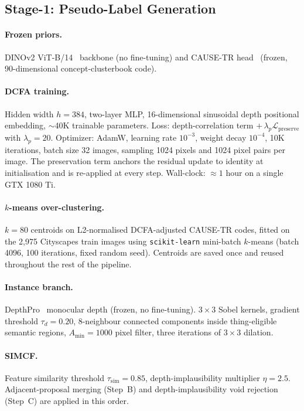 \documentclass{article}
\begin{document}
\subsection{Stage-1: Pseudo-Label Generation}
\label{sec:supp:impl:stage1}

\paragraph{Frozen priors.}
DINOv2 ViT-B/14~\cite{oquab2024dinov2} backbone (no fine-tuning) and CAUSE-TR head~\cite{kim2024cause} (frozen, 90-dimensional concept-clusterbook code).

\paragraph{DCFA training.}
Hidden width $h{=}384$, two-layer MLP, 16-dimensional sinusoidal depth positional embedding, $\sim$40K trainable parameters. Loss: depth-correlation term $+\,\lambda_p \mathcal{L}_\text{preserve}$ with $\lambda_p{=}20$. Optimizer: AdamW, learning rate $10^{-3}$, weight decay $10^{-4}$, 10K iterations, batch size 32 images, sampling 1024 pixels and 1024 pixel pairs per image. The preservation term anchors the residual update to identity at initialisation and is re-applied at every step. Wall-clock: $\approx 1$ hour on a single GTX 1080 Ti.

\paragraph{$k$-means over-clustering.}
$k{=}80$ centroids on L2-normalised DCFA-adjusted CAUSE-TR codes, fitted on the 2{,}975 Cityscapes train images using \texttt{scikit-learn} mini-batch $k$-means (batch 4096, 100 iterations, fixed random seed). Centroids are saved once and reused throughout the rest of the pipeline.

\paragraph{Instance branch.}
DepthPro~\cite{bochkovskii2024depthpro} monocular depth (frozen, no fine-tuning). $3\times3$ Sobel kernels, gradient threshold $\tau_d{=}0.20$, 8-neighbour connected components inside thing-eligible semantic regions, $A_\text{min}{=}1000$ pixel filter, three iterations of $3\times3$ dilation.

\paragraph{SIMCF.}
Feature similarity threshold $\tau_\text{sim}{=}0.85$, depth-implausibility multiplier $\eta{=}2.5$. Adjacent-proposal merging (Step~B) and depth-implausibility void rejection (Step~C) are applied in this order.
\end{document}
